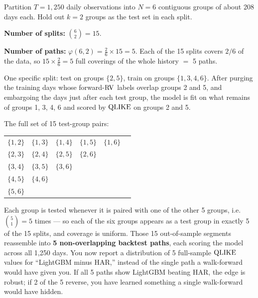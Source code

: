 \begin{workedexample}[CPCV with $N = 6$, $k = 2$]
Partition $T = 1{,}250$ daily observations into $N = 6$ contiguous groups of about 208 days each.
Hold out $k = 2$ groups as the test set in each split.

\textbf{Number of splits:} $\binom{6}{2} = 15$.

\textbf{Number of paths:} $\varphi(6,2) = \frac{2}{6} \times 15 = 5$.
Each of the 15 splits covers $2/6$ of the data, so $15 \times \frac{2}{6} = 5$ full coverings of the whole history $=$ 5 paths.

One specific split: test on groups $\{2,5\}$, train on groups $\{1,3,4,6\}$.
After purging the training days whose forward-$\operatorname{RV}$ labels overlap groups 2 and 5, and embargoing the days just after each test group, the model is fit on what remains of groups 1, 3, 4, 6 and scored by $\operatorname{QLIKE}$ on groups 2 and 5.

The full set of 15 test-group pairs:
\begin{center}
\begin{tabular}{cccccc}
\toprule
$\{1,2\}$ & $\{1,3\}$ & $\{1,4\}$ & $\{1,5\}$ & $\{1,6\}$ & \\
$\{2,3\}$ & $\{2,4\}$ & $\{2,5\}$ & $\{2,6\}$ & & \\
$\{3,4\}$ & $\{3,5\}$ & $\{3,6\}$ & & & \\
$\{4,5\}$ & $\{4,6\}$ & & & & \\
$\{5,6\}$ & & & & & \\
\bottomrule
\end{tabular}
\end{center}

Each group is tested whenever it is paired with one of the other 5 groups, i.e.\ $\binom{5}{1} = 5$ times --- so each of the six groups appears as a test group in exactly 5 of the 15 splits, and coverage is uniform.
Those 15 out-of-sample segments reassemble into \textbf{5 non-overlapping backtest paths}, each scoring the model across all 1,250 days.
You now report a distribution of 5 full-sample $\operatorname{QLIKE}$ values for ``LightGBM minus HAR,'' instead of the single path a walk-forward would have given you.
If all 5 paths show LightGBM beating HAR, the edge is robust; if 2 of the 5 reverse, you have learned something a single walk-forward would have hidden.
\end{workedexample}

